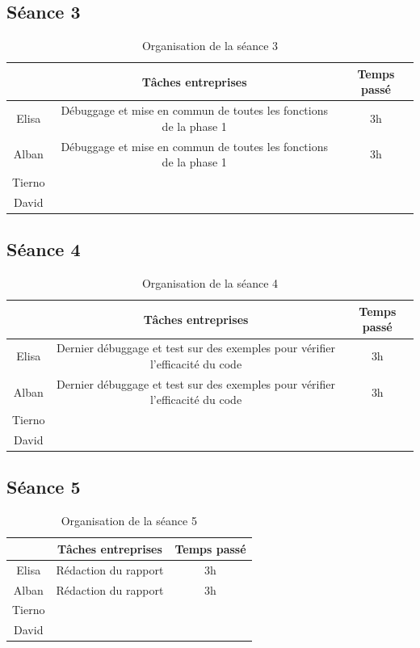 \documentclass{rapport}
\begin{document}
\subsection{Séance 3}

\begin{table}[H]
	\centering 
	\begin{tabular}{c|c|c}
		& Tâches entreprises& Temps passé\\ \hline
		Elisa& Débuggage et mise en commun de toutes les fonctions de la phase 1 & 3h\\ \hline
		Alban& Débuggage et mise en commun de toutes les fonctions de la phase 1& 3h\\ \hline
		Tierno& & \\ \hline
		David& & 
	\end{tabular}
	\caption{Organisation de la séance 3}
\end{table}

\subsection{Séance 4}

\begin{table}[H]
	\centering 
	\begin{tabular}{c|c|c}
		& Tâches entreprises& Temps passé\\ \hline
		Elisa& Dernier débuggage et test sur des exemples pour vérifier l'efficacité du code& 3h\\ \hline
		Alban& Dernier débuggage et test sur des exemples pour vérifier l'efficacité du code& 3h\\ \hline
		Tierno& & \\ \hline
		David& & 
	\end{tabular}
	\caption{Organisation de la séance 4}
\end{table}

\subsection{Séance 5} %

\begin{table}[H]
	\centering 
	\begin{tabular}{c|c|c}
		& Tâches entreprises& Temps passé\\ \hline
		Elisa& Rédaction du rapport & 3h\\ \hline
		Alban& Rédaction du rapport & 3h\\ \hline
		Tierno& & \\ \hline
		David& & 
	\end{tabular}
	\caption{Organisation de la séance 5}
\end{table}
\end{document}
